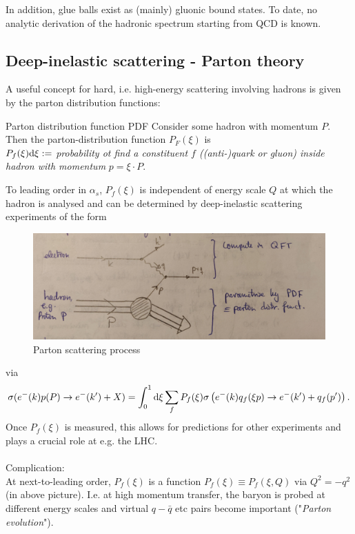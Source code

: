 In addition, glue balls exist as (mainly) gluonic bound states. To date, no analytic derivation of the hadronic spectrum starting from QCD is known.
\newpage
\subsection{Deep-inelastic scattering - Parton theory}
A useful concept for hard, i.e. high-energy scattering involving hadrons is given by the parton distribution functions:
\begin{mybox}{Parton distribution function PDF}
	Consider some hadron with momentum $P$. Then the parton-distribution function $P_F(\xi)$ is \\
	$P_f(\xi)\mathrm{d} \xi:=$ \emph{probability ot find a constituent $f$ ((anti-)quark or gluon) inside hadron with momentum} $p=\xi \cdot P$.
\end{mybox}
To leading order in $\alpha_s$, $P_f(\xi)$ is independent of energy scale $Q$ at which the hadron is analysed and can be determined by deep-inelastic scattering experiments of the form 

\begin{figure}[h!]
	\centering
	\includegraphics[width=0.7\linewidth]{gfx/YMpictures/PartonScattering}
	\caption{Parton scattering process}
	\label{fig:partonscattering}
\end{figure}










via
\begin{equation}
	\sigma(e^-(k)p(P) \rightarrow e^-(k^\prime)+X) = \int_0^1 \mathrm{d} \xi \sum_f P_f(\xi) \sigma\left(e^-(k) q_f( \xi p) \rightarrow e^-(k^\prime) +q_f(p^\prime)\right).
\end{equation}
Once $P_f(\xi)$ is measured, this allows for predictions for other experiments and plays a crucial role at e.g. the LHC.\\
\\
Complication:\\
At next-to-leading order, $P_f(\xi)$ is a function $P_f(\xi)\equiv P_f(\xi,Q)$ via $Q^2=-q^2$ (in above picture). I.e. at high momentum transfer, the baryon is probed at different energy scales and virtual $q-\bar{q}$ etc pairs become important ("\emph{Parton evolution}").






